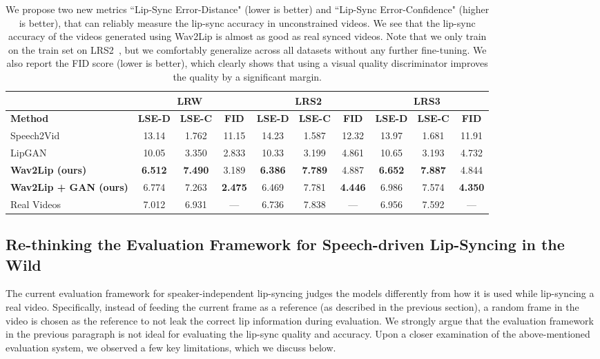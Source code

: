 \documentclass[sigconf]{acmart}
\begin{document}
\begin{table*}[ht]
  \setlength{\tabcolsep}{4pt}
    \centering
    
    \begin{tabular}{|l||c|c|c||c|c|c||c|c|c|}
    \hline
    & \multicolumn{3}{c||}{LRW~\cite{chung2016lip}} & \multicolumn{3}{c||}{LRS2~\cite{Afouras18c}} & \multicolumn{3}{c|}{LRS3~\cite{afouras2018lrs3}}
     \\
    \hline
    \textbf{Method} & \textbf{LSE-D	} & \textbf{LSE-C } & \textbf{FID } & \textbf{LSE-D } & \textbf{LSE-C } & \textbf{FID } & \textbf{LSE-D } & \textbf{LSE-C } & \textbf{FID	} \\
    \hline
    Speech2Vid~\cite{jamaludin2019you} & 13.14 & 1.762 & 11.15 & 14.23 & 1.587 & 12.32 & 13.97 & 1.681 & 11.91\\
    LipGAN~\cite{kr2019towards} & 10.05 & 3.350 & 2.833 & 10.33 & 3.199 & 4.861 & 10.65 & 3.193 & 4.732 \\
    \textbf{Wav2Lip (ours)} & \textbf{6.512} & \textbf{7.490} & 3.189 & \textbf{6.386} & \textbf{7.789} & 4.887 & \textbf{6.652} & \textbf{7.887} & 4.844 \\
    \textbf{Wav2Lip + GAN (ours)} & 6.774 & 7.263 & \textbf{2.475} & 6.469 & 7.781 & \textbf{4.446} & 6.986 & 7.574 & \textbf{4.350} \\
    \hline
    Real Videos & 7.012  & 6.931  & --- & 6.736 & 7.838 & --- & 6.956 & 7.592 & --- \\
    \hline
    
    \end{tabular}
    \caption{We propose two new metrics ``Lip-Sync Error-Distance" (lower is better) and ``Lip-Sync Error-Confidence" (higher is better), that can reliably measure the lip-sync accuracy in unconstrained videos. We see that the lip-sync accuracy of the videos generated using Wav2Lip is almost as good as real synced videos. Note that we only train on the train set on LRS2~\cite{Afouras18c}, but we comfortably generalize across all datasets without any further fine-tuning. We also report the FID score (lower is better), which clearly shows that using a visual quality discriminator improves the quality by a significant margin.}
    \vspace{-0.7cm}
    \label{tab:lse_scores}
\end{table*}

\subsection{Re-thinking the Evaluation Framework for Speech-driven Lip-Syncing in the Wild}
The current evaluation framework for speaker-independent lip-syncing judges the models differently from how it is used while lip-syncing a real video. Specifically, instead of feeding the current frame as a reference (as described in the previous section), a random frame in the video is chosen as the reference to not leak the correct lip information during evaluation. We strongly argue that the evaluation framework in the previous paragraph is not ideal for evaluating the lip-sync quality and accuracy. Upon a closer examination of the above-mentioned evaluation system, we observed a few key limitations, which we discuss below. 
\end{document}
